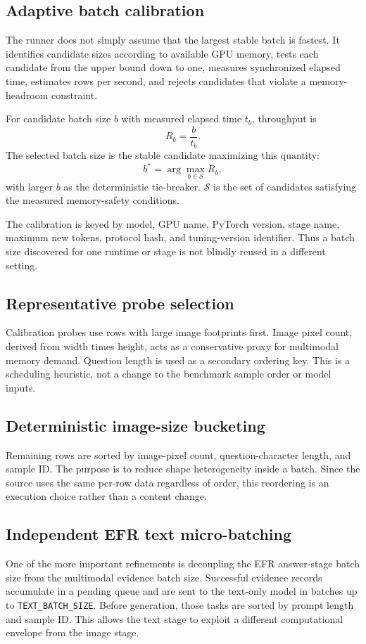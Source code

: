 \documentclass[11pt,a4paper]{article}
\newcommand{\code}[1]{\texttt{#1}}
\begin{document}
\subsection{Adaptive batch calibration}
The runner does not simply assume that the largest stable batch is fastest. It identifies candidate sizes according to available GPU memory, tests each candidate from the upper bound down to one, measures synchronized elapsed time, estimates rows per second, and rejects candidates that violate a memory-headroom constraint.

For candidate batch size \(b\) with measured elapsed time \(t_b\), throughput is
\begin{equation}
R_b = \frac{b}{t_b}.
\end{equation}
The selected batch size is the stable candidate maximizing this quantity:
\begin{equation}
b^* = \arg\max_{b \in \mathcal{S}} R_b,
\end{equation}
with larger \(b\) as the deterministic tie-breaker. \(\mathcal{S}\) is the set of candidates satisfying the measured memory-safety conditions.

The calibration is keyed by model, GPU name, PyTorch version, stage name, maximum new tokens, protocol hash, and tuning-version identifier. Thus a batch size discovered for one runtime or stage is not blindly reused in a different setting.

\subsection{Representative probe selection}
Calibration probes use rows with large image footprints first. Image pixel count, derived from width times height, acts as a conservative proxy for multimodal memory demand. Question length is used as a secondary ordering key. This is a scheduling heuristic, not a change to the benchmark sample order or model inputs.

\subsection{Deterministic image-size bucketing}
Remaining rows are sorted by image-pixel count, question-character length, and sample ID. The purpose is to reduce shape heterogeneity inside a batch. Since the source uses the same per-row data regardless of order, this reordering is an execution choice rather than a content change.

\subsection{Independent EFR text micro-batching}
One of the more important refinements is decoupling the EFR answer-stage batch size from the multimodal evidence batch size. Successful evidence records accumulate in a pending queue and are sent to the text-only model in batches up to \code{TEXT\_BATCH\_SIZE}. Before generation, those tasks are sorted by prompt length and sample ID. This allows the text stage to exploit a different computational envelope from the image stage.
\end{document}

